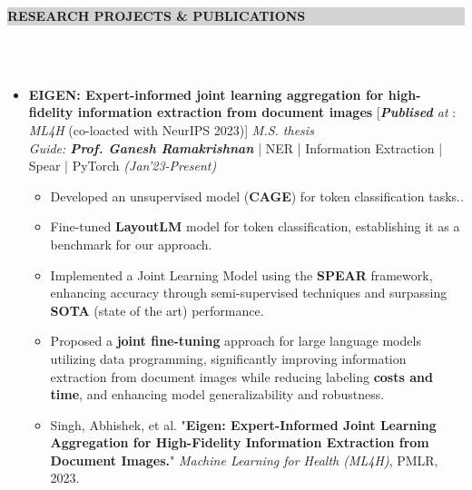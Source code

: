 \documentclass[a4paper,10.5pt]{article}
\newcommand{\lsep}{-0.5cm}
\newcommand{\resheading}[1]{{\small \colorbox{lightgray}{\begin{minipage}{0.975\textwidth}{\textbf{#1 \vphantom{p\^{E}}}}\end{minipage}}}}
\begin{document}
\resheading{\textbf{RESEARCH PROJECTS \& PUBLICATIONS}}\\[\lsep] \\[-0.4cm]

\begin{itemize}
\item \textbf{EIGEN: Expert-informed joint learning aggregation for high-fidelity information extraction from document images} \hspace{0.5cm} [\textit{\textbf{Publised} at} : \textit{ML4H} (co-loacted with NeurIPS 2023)] \hfill \emph{M.S. thesis}\\
\emph{Guide: \textbf{Prof. Ganesh Ramakrishnan}} | {NER | Information Extraction | Spear | PyTorch } \hfill \emph{(Jan'23-Present)}\\[-0.5cm]
    \begin{itemize}[noitemsep,nolistsep]
        \item Developed an unsupervised model (\textbf{CAGE}) for token classification tasks..
        \vspace{0.07cm}
        \item Fine-tuned \textbf{LayoutLM} model for token classification, establishing it as a benchmark for our approach.
        \vspace{0.07cm}
        \item Implemented a Joint Learning Model using the \textbf{SPEAR} framework, enhancing accuracy through semi-supervised techniques and surpassing \textbf{SOTA} (state of the art) performance.
        \vspace{0.07cm}
        \item Proposed a \textbf{joint fine-tuning} approach for large language models utilizing data programming, significantly improving information extraction from document images while reducing labeling \textbf{costs and time}, and enhancing model generalizability and robustness.
        \vspace{0.07cm}
        \item Singh, Abhishek, et al. "\textbf{Eigen: Expert-Informed Joint Learning Aggregation for High-Fidelity Information Extraction from Document Images.}" \textit{Machine Learning for Health (ML4H)}, PMLR, 2023.
    \end{itemize}
\vspace{-0.1cm} 


\end{itemize}
\end{document}
